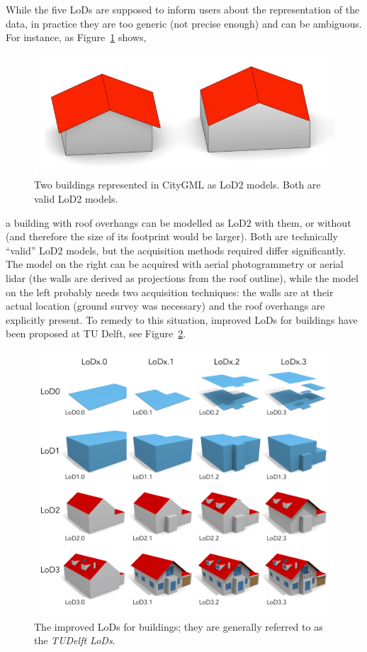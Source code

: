 %

While the five LoDs are supposed to inform users about the representation of the data, in practice they are too generic (not precise enough) and can be ambiguous. 
For instance, as Figure~\ref{fig:lod_ambiguity} shows,
\begin{figure}
  \centering
  \includegraphics[width=0.45\linewidth]{figs/lod_ambiguity_b}
  \caption{Two buildings represented in CityGML as LoD2 models. Both are valid LoD2 models.}
\label{fig:lod_ambiguity}
\end{figure}
a building with roof overhangs can be modelled as LoD2 with them, or without (and therefore the size of its footprint would be larger).
Both are technically ``valid'' LoD2 models, but the acquisition methods required differ significantly.
The model on the right can be acquired with aerial photogrammetry or aerial lidar (the walls are derived as projections from the roof outline), while the model on the left probably needs two acquisition techniques: the walls are at their actual location (ground survey was necessary) and the roof overhangs are explicitly present.
To remedy to this situation, improved LoDs for buildings have been proposed at TU Delft, see Figure~\ref{fig:refinedLODs}.
\begin{figure}
  \centering
  \includegraphics[width=0.95\linewidth]{figs/refinedLODs}
  \caption{The improved LoDs for buildings; they are generally referred to as the \emph{TUDelft LoDs}.}
\label{fig:refinedLODs}
\end{figure}

